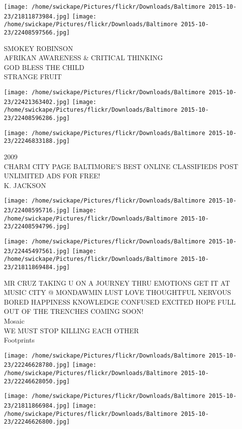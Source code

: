 \documentclass[10pt,letterpaper]{article}
\begin{document}
\texttt{[image: /home/swickape/Pictures/flickr/Downloads/Baltimore 2015-10-23/21811873984.jpg]}
\texttt{[image: /home/swickape/Pictures/flickr/Downloads/Baltimore 2015-10-23/22408597566.jpg]}

SMOKEY ROBINSON\\
AFRIKAN AWARENESS \& CRITICAL THINKING\\
GOD BLESS THE CHILD\\
STRANGE FRUIT
\pagebreak

\texttt{[image: /home/swickape/Pictures/flickr/Downloads/Baltimore 2015-10-23/22421363402.jpg]}
\texttt{[image: /home/swickape/Pictures/flickr/Downloads/Baltimore 2015-10-23/22408596286.jpg]}

\vspace{0.25in}
\texttt{[image: /home/swickape/Pictures/flickr/Downloads/Baltimore 2015-10-23/22246833188.jpg]}

2009\\
CHARM CITY PAGE BALTIMORE'S BEST ONLINE CLASSIFIEDS POST UNLIMITED ADS FOR FREE!\\
K. JACKSON
\pagebreak

\texttt{[image: /home/swickape/Pictures/flickr/Downloads/Baltimore 2015-10-23/22408595716.jpg]}
\texttt{[image: /home/swickape/Pictures/flickr/Downloads/Baltimore 2015-10-23/22408594796.jpg]}

\texttt{[image: /home/swickape/Pictures/flickr/Downloads/Baltimore 2015-10-23/22445497561.jpg]}
\texttt{[image: /home/swickape/Pictures/flickr/Downloads/Baltimore 2015-10-23/21811869484.jpg]}

MR CRUZ TAKING U ON A JOURNEY THRU EMOTIONS GET IT AT MUSIC CITY @ MONDAWMIN LUST LOVE THOUGHTFUL NERVOUS BORED HAPPINESS KNOWLEDGE CONFUSED EXCITED HOPE FULL OUT OF THE TRENCHES COMING SOON!\\
Mosaic\\
WE MUST STOP KILLING EACH OTHER\\
Footprints
\pagebreak

\texttt{[image: /home/swickape/Pictures/flickr/Downloads/Baltimore 2015-10-23/22246628780.jpg]}
\texttt{[image: /home/swickape/Pictures/flickr/Downloads/Baltimore 2015-10-23/22246628050.jpg]}

\texttt{[image: /home/swickape/Pictures/flickr/Downloads/Baltimore 2015-10-23/21811866984.jpg]}
\texttt{[image: /home/swickape/Pictures/flickr/Downloads/Baltimore 2015-10-23/22246626800.jpg]}
\end{document}
